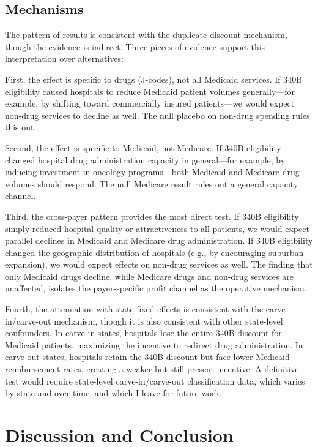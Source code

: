 \documentclass[12pt]{article}
\begin{document}
\subsection{Mechanisms}

The pattern of results is consistent with the duplicate discount mechanism, though the evidence is indirect. Three pieces of evidence support this interpretation over alternatives:

First, the effect is specific to drugs (J-codes), not all Medicaid services. If 340B eligibility caused hospitals to reduce Medicaid patient volumes generally---for example, by shifting toward commercially insured patients---we would expect non-drug services to decline as well. The null placebo on non-drug spending rules this out.

Second, the effect is specific to Medicaid, not Medicare. If 340B eligibility changed hospital drug administration capacity in general---for example, by inducing investment in oncology programs---both Medicaid and Medicare drug volumes should respond. The null Medicare result rules out a general capacity channel.

Third, the cross-payer pattern provides the most direct test. If 340B eligibility simply reduced hospital quality or attractiveness to all patients, we would expect parallel declines in Medicaid and Medicare drug administration. If 340B eligibility changed the geographic distribution of hospitals (e.g., by encouraging suburban expansion), we would expect effects on non-drug services as well. The finding that only Medicaid drugs decline, while Medicare drugs and non-drug services are unaffected, isolates the payer-specific profit channel as the operative mechanism.

Fourth, the attenuation with state fixed effects is consistent with the carve-in/carve-out mechanism, though it is also consistent with other state-level confounders. In carve-in states, hospitals lose the entire 340B discount for Medicaid patients, maximizing the incentive to redirect drug administration. In carve-out states, hospitals retain the 340B discount but face lower Medicaid reimbursement rates, creating a weaker but still present incentive. A definitive test would require state-level carve-in/carve-out classification data, which varies by state and over time, and which I leave for future work.


\section{Discussion and Conclusion}
\end{document}

